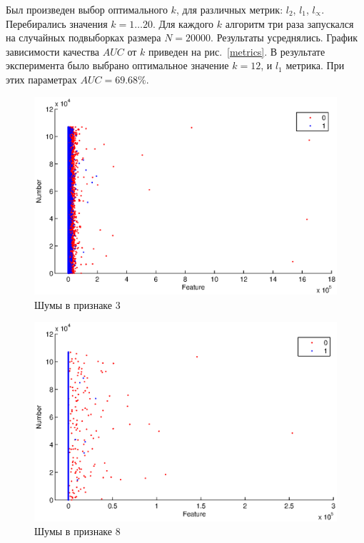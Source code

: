 \documentclass[8pt, a4paper]{article}
\begin{document}
Был произведен выбор оптимального $k$, для различных метрик: $l_2$, $l_1$, $l_{\propto}$.
Перебирались значения $k=1 \hdots 20$. Для каждого $k$ алгоритм три раза запускался на случайных подвыборках
размера $N=20000$. Результаты усреднялись. График зависимости качества $AUC$ от $k$ приведен на
рис.~\ref{metrics}.
В результате эксперимента было выбрано оптимальное значение $k=12$, и $l_1$ метрика.
При этих параметрах $AUC=69.68\%$.
\begin{figure}[h]
    \includegraphics[width=\textwidth]{feat3.eps}
    \caption{Шумы в признаке 3}
    \label{feat3}
\end{figure}
\begin{figure}[h]
    \includegraphics[width=\textwidth]{feat8.eps}
    \caption{Шумы в признаке 8}
    \label{feat8}
\end{figure}
\end{document}
